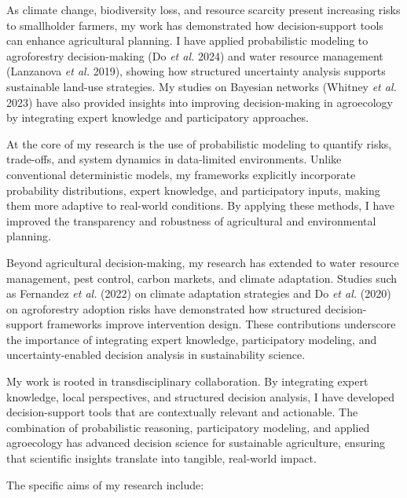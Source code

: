 \documentclass[
]{article}
\begin{document}
As climate change, biodiversity loss, and resource scarcity present
increasing risks to smallholder farmers, my work has demonstrated how
decision-support tools can enhance agricultural planning. I have applied
probabilistic modeling to agroforestry decision-making (Do \emph{et al.}
2024) and water resource management (Lanzanova \emph{et al.} 2019),
showing how structured uncertainty analysis supports sustainable
land-use strategies. My studies on Bayesian networks (Whitney \emph{et
al.} 2023) have also provided insights into improving decision-making in
agroecology by integrating expert knowledge and participatory
approaches.

At the core of my research is the use of probabilistic modeling to
quantify risks, trade-offs, and system dynamics in data-limited
environments. Unlike conventional deterministic models, my frameworks
explicitly incorporate probability distributions, expert knowledge, and
participatory inputs, making them more adaptive to real-world
conditions. By applying these methods, I have improved the transparency
and robustness of agricultural and environmental planning.

Beyond agricultural decision-making, my research has extended to water
resource management, pest control, carbon markets, and climate
adaptation. Studies such as Fernandez \emph{et al.} (2022) on climate
adaptation strategies and Do \emph{et al.} (2020) on agroforestry
adoption risks have demonstrated how structured decision-support
frameworks improve intervention design. These contributions underscore
the importance of integrating expert knowledge, participatory modeling,
and uncertainty-enabled decision analysis in sustainability science.

My work is rooted in transdisciplinary collaboration. By integrating
expert knowledge, local perspectives, and structured decision analysis,
I have developed decision-support tools that are contextually relevant
and actionable. The combination of probabilistic reasoning,
participatory modeling, and applied agroecology has advanced decision
science for sustainable agriculture, ensuring that scientific insights
translate into tangible, real-world impact.

The specific aims of my research include:
\end{document}
